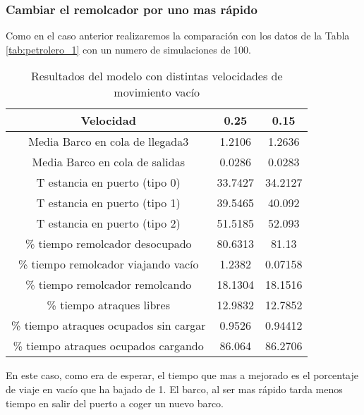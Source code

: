 \documentclass[12pt,a4paper]{article}
\begin{document}
\subsubsection{Cambiar el remolcador por uno mas rápido}
Como en el caso anterior realizaremos la comparación con los datos de la Tabla \ref{tab:petrolero_1} con un numero de simulaciones de 100.
\begin{table}[H]
	\centering
	\begin{tabular}{c|cc}\toprule
		Velocidad&0.25&0.15\\\midrule
		Media Barco en cola de llegada3&1.2106&1.2636\\
		Media Barco en cola de salidas&0.0286&0.0283\\
		T estancia en puerto (tipo 0)&33.7427&34.2127\\
		T estancia en puerto (tipo 1)&39.5465&40.092\\
		T estancia en puerto (tipo 2)&51.5185&52.093\\
		\% tiempo remolcador desocupado&80.6313&81.13\\
		\% tiempo remolcador viajando vacío&1.2382&0.07158\\
		\% tiempo remolcador remolcando&18.1304&18.1516\\
		\% tiempo atraques libres&12.9832&12.7852\\
		\% tiempo atraques ocupados sin cargar&0.9526&0.94412\\
		\% tiempo atraques ocupados cargando&86.064&86.2706\\
	\end{tabular}
	\caption{Resultados del modelo con distintas velocidades de movimiento vacío} \label{tab:petrolero_4}
\end{table}
En este caso, como era de esperar, el tiempo que mas a mejorado es el porcentaje de viaje en vacío que ha bajado de 1. El barco, al ser mas rápido tarda menos tiempo en salir del puerto a coger un nuevo barco.
\end{document}
